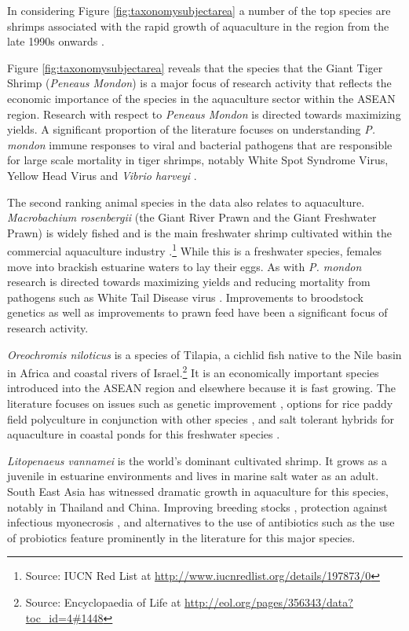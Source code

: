 \documentclass[]{book}
\let\rmarkdownfootnote\footnote%
\def\footnote{\protect\rmarkdownfootnote}
\theoremstyle{definition}
\theoremstyle{definition}
\theoremstyle{definition}
\theoremstyle{remark}
\begin{document}
In considering Figure \ref{fig:taxonomysubjectarea} a number of the top
species are shrimps associated with the rapid growth of aquaculture in
the region from the late 1990s onwards \citep{Hishamunda_2009}.

Figure \ref{fig:taxonomysubjectarea} reveals that the species that the
Giant Tiger Shrimp (\emph{Peneaus Mondon}) is a major focus of research
activity that reflects the economic importance of the species in the
aquaculture sector within the ASEAN region. Research with respect to
\emph{Peneaus Mondon} is directed towards maximizing yields. A
significant proportion of the literature focuses on understanding
\emph{P. mondon} immune responses to viral and bacterial pathogens that
are responsible for large scale mortality in tiger shrimps, notably
White Spot Syndrome Virus, Yellow Head Virus and \emph{Vibrio harveyi}
\citep{Wongteerasupaya_1995, Ponprateep_2011, Jaree_2012}.

The second ranking animal species in the data also relates to
aquaculture. \emph{Macrobachium rosenbergii} (the Giant River Prawn and
the Giant Freshwater Prawn) is widely fished and is the main freshwater
shrimp cultivated within the commercial aquaculture industry
\citep{Macrobrachium_2012}.\footnote{Source: IUCN Red List at
  \url{http://www.iucnredlist.org/details/197873/0}} While this is a
freshwater species, females move into brackish estuarine waters to lay
their eggs. As with \emph{P. mondon} research is directed towards
maximizing yields and reducing mortality from pathogens such as White
Tail Disease virus \citep{Bonami_2011}. Improvements to broodstock
genetics \citep{Karaket_2012, Nguyen_Thanh_2015, Thanh_2010} as well as
improvements to prawn feed \citep{Kangpanich_2016} have been a
significant focus of research activity.

\emph{Oreochromis niloticus} is a species of Tilapia, a cichlid fish
native to the Nile basin in Africa and coastal rivers of
Israel.\footnote{Source: Encyclopaedia of Life at
  \url{http://eol.org/pages/356343/data?toc_id=4\#1448}} It is an
economically important species introduced into the ASEAN region and
elsewhere because it is fast growing. The literature focuses on issues
such as genetic improvement \citep{Bentsen_1998}, options for rice paddy
field polyculture in conjunction with other species \citep{Vromant_2002}
, and salt tolerant hybrids for aquaculture in coastal ponds for this
freshwater species \citep{Kamal_2005}.

\emph{Litopenaeus vannamei} is the world's dominant cultivated shrimp.
It grows as a juvenile in estuarine environments and lives in marine
salt water as an adult. South East Asia has witnessed dramatic growth in
aquaculture for this species, notably in Thailand and China. Improving
breeding stocks \citep{Nimrat_2006}, protection against infectious
myonecrosis \citep{Silva_2010}, and alternatives to the use of
antibiotics such as the use of probiotics \citep{Nimrat_2011} feature
prominently in the literature for this major species.
\end{document}
